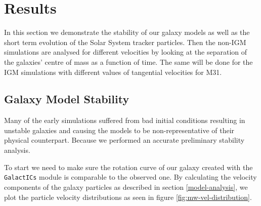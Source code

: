 \documentclass[a4paper,12pt, english]{article}
\begin{document}
\section{Results}
\label{results}
In this section we demonstrate the stability of our galaxy models as well as the short term evolution of the Solar System tracker particles. Then the non-IGM simulations are analysed for different velocities by looking at the separation of the galaxies' centre of mass as a function of time. The same will be done for the IGM simulations with different values of tangential velocities for M31.\par
\smallskip

\subsection{Galaxy Model Stability}
\label{Simulation Stability}
Many of the early simulations suffered from bad initial conditions resulting in unstable galaxies and causing the models to be non-representative of their physical counterpart. Because we performed an accurate preliminary stability analysis.\par
\smallskip
To start we need to make sure the rotation curve of our galaxy created with the \texttt{GalactICs} module is comparable to the observed one. By calculating the velocity components of the galaxy particles as described in section \ref{model-analysis}, we plot the particle velocity distributions as seen in figure \ref{fig:mw-vel-distribution}.
\end{document}
